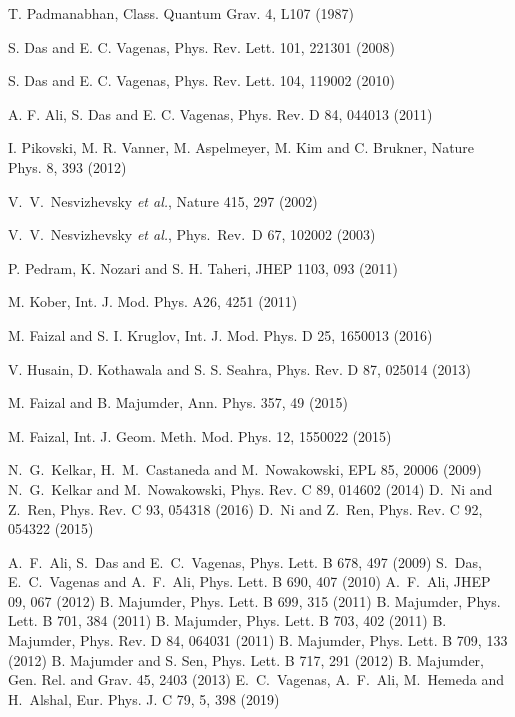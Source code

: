 \documentclass[12pt]{article}
\begin{document}
\begin{thebibliography}{99}
  T. Padmanabhan, Class. Quantum Grav. 4, L107 (1987)

 S. Das and E. C. Vagenas,  Phys. Rev. Lett. 101, 221301 (2008) 

S. Das and E. C. Vagenas, Phys. Rev. Lett. 104, 119002 (2010) 

 A. F. Ali, S. Das and E. C. Vagenas,  Phys. Rev. D 84, 044013 (2011)  

  I. Pikovski, M. R. Vanner, M. Aspelmeyer, M. Kim and C. Brukner,  Nature Phys. 8, 393 (2012) 

 V.~V.~Nesvizhevsky {\it et al.},  Nature { 415}, 297 (2002)

  V.~V.~Nesvizhevsky {\it et al.}, Phys.\ Rev.\ D   67, 102002 (2003)

 P. Pedram, K. Nozari and S. H. Taheri,  JHEP  1103, 093 (2011) 

 

M. Kober,  Int. J. Mod. Phys. A26, 4251 (2011) 

M. Faizal and  S.  I. Kruglov, Int. J. Mod. Phys. D 25, 1650013 (2016)

V.  Husain, D.  Kothawala and  S.  S. Seahra,  Phys. Rev. D 87, 025014 (2013) 

 M. Faizal and B. Majumder,  Ann. Phys. 357,  49 (2015) 

M. Faizal, Int. J. Geom. Meth. Mod. Phys. 12, 1550022 (2015) 

N.~G.~Kelkar, H.~M.~Castaneda and M.~Nowakowski, EPL {85},   20006 (2009)
N.~G.~Kelkar and M.~Nowakowski, Phys. Rev. C {89},   014602 (2014)
D.~Ni and Z.~Ren, Phys. Rev. C  {93},  054318 (2016)
 D.~Ni and Z.~Ren, Phys. Rev. C {92},   054322 (2015)


A.~F.~Ali, S.~Das and E.~C.~Vagenas, Phys. Lett. B {678}, 497 (2009)
S.~Das, E.~C.~Vagenas and A.~F.~Ali, Phys. Lett. B {690}, 407 (2010)
A.~F.~Ali, JHEP {09}, 067 (2012)
 B. Majumder, Phys. Lett. B {699}, 315 (2011)
 B. Majumder, Phys. Lett. B {701}, 384 (2011)
 B. Majumder, Phys. Lett. B {703}, 402 (2011)
 B. Majumder, Phys. Rev. D {84}, 064031 (2011)
 B. Majumder, Phys. Lett. B {709}, 133 (2012)
 B. Majumder and S. Sen, Phys. Lett. B {717}, 291 (2012)
B. Majumder, Gen. Rel. and Grav. {45}, 2403 (2013)
 E.~C.~Vagenas, A.~F.~Ali, M.~Hemeda and H.~Alshal, Eur. Phys. J. C {79}, 5, 398 (2019)



\end{thebibliography}
\end{document}
